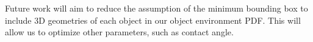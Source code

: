 \documentclass[letterpaper, 10 pt, conference]{ieeeconf}  %
\begin{document}
Future work will aim to reduce the assumption of the minimum bounding box to include 3D geometries of each object in our object environment PDF. This will allow us to optimize other parameters, such as contact angle.










%
%
\end{document}
